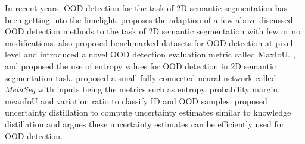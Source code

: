     In recent years, OOD detection for the task of 2D semantic segmentation has been getting into the limelight.
    \cite{pixel_OOD} proposes the adaption of a few above discussed OOD detection methods to the task of 2D semantic segmentation with few or no modifications.
    \cite{pixel_OOD} also proposed benchmarked datasets for OOD detection at pixel level and introduced a novel OOD detection evaluation metric called MaxIoU.
    \cite{SemSeg_Entropy1}, and \cite{SemSeg_Entropy2} proposed the use of entropy values for OOD detection in 2D semantic segmentation task.
    \cite{MetaSeg} proposed a small fully connected neural network called \textit{MetaSeg} with inputs being the metrics such as entropy, probability margin, meanIoU and variation ratio to classify ID and OOD samples.
    \cite{uncertianty_distillation} proposed uncertainty distillation to compute uncertainty estimates similar to knowledge distillation and argues these uncertainty estimates can be efficiently used for OOD detection.

    


